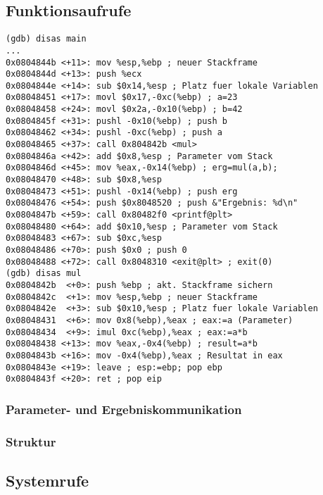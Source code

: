 \subsection{Funktionsaufrufe}
\begin{lstlisting}[language={[x86masm]Assembler}]
(gdb) disas main
...
0x0804844b <+11>: mov %esp,%ebp ; neuer Stackframe
0x0804844d <+13>: push %ecx
0x0804844e <+14>: sub $0x14,%esp ; Platz fuer lokale Variablen
0x08048451 <+17>: movl $0x17,-0xc(%ebp) ; a=23
0x08048458 <+24>: movl $0x2a,-0x10(%ebp) ; b=42
0x0804845f <+31>: pushl -0x10(%ebp) ; push b
0x08048462 <+34>: pushl -0xc(%ebp) ; push a
0x08048465 <+37>: call 0x804842b <mul>
0x0804846a <+42>: add $0x8,%esp ; Parameter vom Stack
0x0804846d <+45>: mov %eax,-0x14(%ebp) ; erg=mul(a,b);
0x08048470 <+48>: sub $0x8,%esp
0x08048473 <+51>: pushl -0x14(%ebp) ; push erg
0x08048476 <+54>: push $0x8048520 ; push &"Ergebnis: %d\n"
0x0804847b <+59>: call 0x80482f0 <printf@plt>
0x08048480 <+64>: add $0x10,%esp ; Parameter vom Stack
0x08048483 <+67>: sub $0xc,%esp
0x08048486 <+70>: push $0x0 ; push 0
0x08048488 <+72>: call 0x8048310 <exit@plt> ; exit(0)
(gdb) disas mul
0x0804842b 	<+0>: push %ebp ; akt. Stackframe sichern
0x0804842c  <+1>: mov %esp,%ebp ; neuer Stackframe
0x0804842e  <+3>: sub $0x10,%esp ; Platz fuer lokale Variablen
0x08048431  <+6>: mov 0x8(%ebp),%eax ; eax:=a (Parameter)
0x08048434  <+9>: imul 0xc(%ebp),%eax ; eax:=a*b
0x08048438 <+13>: mov %eax,-0x4(%ebp) ; result=a*b
0x0804843b <+16>: mov -0x4(%ebp),%eax ; Resultat in eax
0x0804843e <+19>: leave ; esp:=ebp; pop ebp
0x0804843f <+20>: ret ; pop eip
\end{lstlisting}
\subsubsection{Parameter- und Ergebniskommunikation}
\subsubsection{Struktur}

\subsection{Systemrufe}
